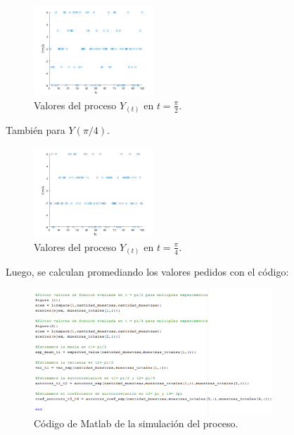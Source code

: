 \begin{figure}[H]
\centering
	\includegraphics[width=0.4\textwidth, trim = {0 0 0 0},clip]{./ImagenesEjercicio1/ypi_2.png}
	\caption{Valores del proceso $Y_(t)$ en $t = \frac{\pi}{2} $.}
	\label{fig:ypi_2}
\end{figure}

También para $Y(\pi/4)$.

\begin{figure}[H]
\centering
	\includegraphics[width=0.4\textwidth, trim = {0 0 0 0},clip]{./ImagenesEjercicio1/ypi_4.png}
	\caption{Valores del proceso $Y_(t)$ en $t = \frac{\pi}{4} $.}
	\label{fig:ypi_4}
\end{figure}

Luego, se calculan promediando los valores pedidos con el código:

\begin{figure}[H]
\centering
	\includegraphics[width=0.8\textwidth, trim = {0 0 0 0},clip]{./ImagenesEjercicio1/main2.png}
	\caption{Código de Matlab de la simulación del proceso.}
	\label{fig:main2}
\end{figure}


